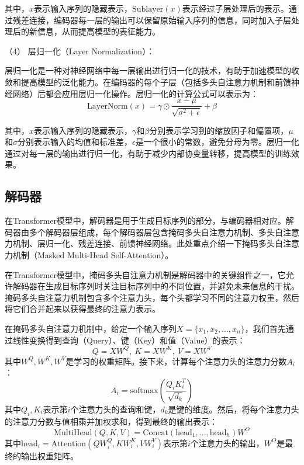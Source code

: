 其中，$x$表示输入序列的隐藏表示，$\text{Sublayer}(x)$表示经过子层处理后的表示。通过残差连接，编码器每一层的输出可以保留原始输入序列的信息，同时加入子层处理后的新信息，从而提高模型的表征能力。

（4） 层归一化（Layer Normalization）：

层归一化是一种对神经网络中每一层输出进行归一化的技术，有助于加速模型的收敛和提高模型的泛化能力。在编码器的每个子层（包括多头自注意力机制和前馈神经网络）后都会应用层归一化操作。层归一化的计算公式可以表示为：
\begin{equation}
	\text{LayerNorm}(x) = \gamma \odot \frac{x - \mu}{\sqrt{\sigma^2 + \epsilon}} + \beta
\end{equation}


其中，$x$表示输入序列的隐藏表示，$\gamma$和$\beta$分别表示学习到的缩放因子和偏置项，$\mu$和$\sigma$分别表示输入的均值和标准差，$\epsilon$是一个很小的常数，避免分母为零。层归一化通过对每一层的输出进行归一化，有助于减少内部协变量转移，提高模型的训练效果。

\subsection{解码器}
在Transformer模型中，解码器是用于生成目标序列的部分，与编码器相对应。解码器由多个解码器层组成，每个解码器层包含掩码多头自注意力机制、多头自注意力机制、层归一化、残差连接、前馈神经网络。此处重点介绍一下掩码多头自注意力机制（Masked Multi-Head Self-Attention）。

在Transformer模型中，掩码多头自注意力机制是解码器中的关键组件之一，它允许解码器在生成目标序列时关注目标序列中的不同位置，并避免未来信息的干扰。掩码多头自注意力机制包含多个注意力头，每个头都学习不同的注意力权重，然后将它们合并起来以获得最终的注意力表示。

在掩码多头自注意力机制中，给定一个输入序列$X = \{x_1, x_2, ..., x_n\}$，我们首先通过线性变换得到查询（Query）、键（Key）和值（Value）的表示：
\begin{equation}
Q = XW^Q, \ K = XW^K, \ V = XW^V
\end{equation}
其中$W^Q, W^K, W^V$是学习的权重矩阵。接下来，计算每个注意力头的注意力分数$A_i$：
\begin{equation}
A_i = \text{softmax}(\frac{Q_iK_i^T}{\sqrt{d_k}})
\end{equation}
其中$Q_i, K_i$表示第$i$个注意力头的查询和键，$d_k$是键的维度。然后，将每个注意力头的注意力分数与值相乘并加权求和，得到最终的输出表示：
\begin{equation}
\text{MultiHead}(Q, K, V) = \text{Concat}(\text{head}_1, ..., \text{head}_h)W^O
\end{equation}
其中$\text{head}_i = \text{Attention}(QW_i^Q, KW_i^K, VW_i^V)$表示第$i$个注意力头的输出，$W^O$是最终的输出权重矩阵。


